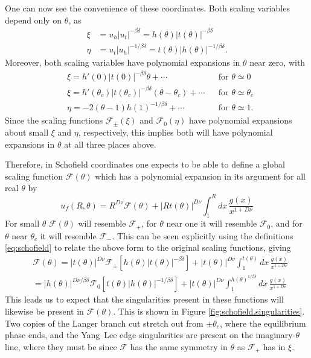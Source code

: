 \documentclass[
  aps,
  pre,
  reprint,
  longbibliography,
  floatfix
]{revtex4-2}
\begin{document}
One can now see the convenience of these coordinates. Both scaling variables depend only on $\theta$, as
\begin{align}
  \xi&=u_h|u_t|^{-\beta\delta}=h(\theta)|t(\theta)|^{-\beta\delta} \\
  \eta&=u_t|u_h|^{-1/\beta\delta}=t(\theta)|h(\theta)|^{-1/\beta\delta}.
\end{align}
Moreover, both scaling variables have polynomial expansions in $\theta$ near zero, with
\begin{align}
  &\xi= h'(0)|t(0)|^{-\beta\delta}\theta+\cdots  && \text{for $\theta\simeq0$}\\
  &\xi=h'(\theta_c)|t(\theta_c)|^{-\beta\delta}(\theta-\theta_c)+\cdots && \text{for $\theta\simeq\theta_c$}
  \\
  &\eta=-2(\theta-1)h(1)^{-1/\beta\delta}+\cdots && \text{for $\theta\simeq1$}.
\end{align}
Since the scaling functions $\mathcal F_\pm(\xi)$ and $\mathcal F_0(\eta)$ have
polynomial expansions about small $\xi$ and $\eta$, respectively, this implies
both will have polynomial expansions in $\theta$ at all three places above.

Therefore, in Schofield coordinates one expects to be able to define a global
scaling function $\mathcal F(\theta)$ which has a polynomial expansion in its
argument for all real $\theta$ by
\begin{equation}
  u_f(R,\theta)=R^{D\nu}\mathcal F(\theta)+|Rt(\theta)|^{D\nu}\int_1^Rdx\,\frac{g(x)}{x^{1+D\nu}}
\end{equation}
For small $\theta$ $\mathcal F(\theta)$ will
resemble $\mathcal F_+$, for $\theta$ near one it will resemble $\mathcal F_0$,
and for $\theta$ near $\theta_c$ it will resemble $\mathcal F_-$. This can be seen explicitly using the definitions \eqref{eq:schofield} to relate the above form to the original scaling functions, giving
\begin{equation} \label{eq:scaling.function.equivalences.2d}
  \begin{aligned}
    &\mathcal F(\theta)
    =|t(\theta)|^{D\nu}\mathcal F_\pm\left[h(\theta)|t(\theta)|^{-\beta\delta}\right]
    +|t(\theta)|^{D\nu}\int_1^{t(\theta)} dx\,\frac{g(x)}{x^{1+D\nu}}\\
    &=|h(\theta)|^{D\nu/\beta\delta}\mathcal F_0\left[t(\theta)|h(\theta)|^{-1/\beta\delta}\right]
    +|t(\theta)|^{D\nu}\int_1^{h(\theta)^{1/\beta\delta}} dx\,\frac{g(x)}{x^{1+D\nu}}
  \end{aligned}
\end{equation}
This leads us
to expect that the singularities present in these functions will likewise be
present in $\mathcal F(\theta)$. This is shown in Figure
\ref{fig:schofield.singularities}. Two copies of the Langer branch cut stretch
out from $\pm\theta_c$, where the equilibrium phase ends, and the Yang--Lee
edge singularities are present on the imaginary-$\theta$ line, where they must be since $\mathcal F$ has the same symmetry in $\theta$ as $\mathcal F_+$ has in $\xi$.
\end{document}
